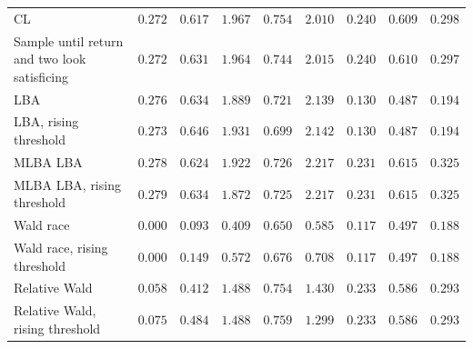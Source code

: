 \begin{table}[t]
\begin{tabular}{>{\raggedright\arraybackslash}p{4.4cm}cccccccc}
\midrule
CL & $0.272$ & $0.617$ & $1.967$ & $0.754$ & $2.010$ & $0.240$ & $0.609$ & $0.298$ \\
Sample until return and two look satisficing & $0.272$ & $0.631$ & $1.964$ & $0.744$ & $2.015$ & $0.240$ & $0.610$ & $0.297$ \\
LBA & $0.276$ & $0.634$ & $1.889$ & $0.721$ & $2.139$ & $0.130$ & $0.487$ & $0.194$ \\
LBA, rising threshold & $0.273$ & $0.646$ & $1.931$ & $0.699$ & $2.142$ & $0.130$ & $0.487$ & $0.194$ \\
MLBA LBA & $0.278$ & $0.624$ & $1.922$ & $0.726$ & $2.217$ & $0.231$ & $0.615$ & $0.325$ \\
MLBA LBA, rising threshold & $0.279$ & $0.634$ & $1.872$ & $0.725$ & $2.217$ & $0.231$ & $0.615$ & $0.325$ \\
Wald race & $0.000$ & $0.093$ & $0.409$ & $0.650$ & $0.585$ & $0.117$ & $0.497$ & $0.188$ \\
Wald race, rising threshold & $0.000$ & $0.149$ & $0.572$ & $0.676$ & $0.708$ & $0.117$ & $0.497$ & $0.188$ \\
Relative Wald & $0.058$ & $0.412$ & $1.488$ & $0.754$ & $1.430$ & $0.233$ & $0.586$ & $0.293$ \\
Relative Wald, rising threshold & $0.075$ & $0.484$ & $1.488$ & $0.759$ & $1.299$ & $0.233$ & $0.586$ & $0.293$ \\
\bottomrule
\end{tabular}
\end{table}

